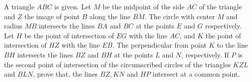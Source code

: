 A triangle $ABC$ is given. Let $M$ be the midpoint of the side $AC$ of the triangle and $Z$ the image of point $B$ along the line $BM$. The circle with center $M$ and radius $MB$ intersects the lines $BA$ and $BC$ at the points $E$ and $G$ respectively. Let $H$ be the point of intersection of $EG$ with the line $AC$, and $K$ the point of intersection of $HZ$ with the line $EB$. The perpendicular from point $K$ to the line $BH$  intersects the lines $BZ$ and $BH$ at the points $L$ and $N$, respectively.
If $P$ is the second point of intersection of the circumscribed circles of the triangles $KZL$ and $BLN$, prove that, the lines $BZ, KN$ and $HP$ intersect at a common point.